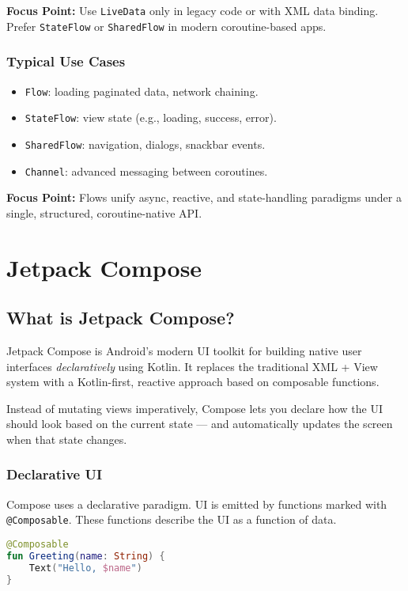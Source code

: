 \documentclass[a4paper,12pt]{article}
\begin{document}
\textbf{Focus Point:} Use \texttt{LiveData} only in legacy code or with XML data binding. Prefer \texttt{StateFlow} or \texttt{SharedFlow} in modern coroutine-based apps.

\subsubsection{Typical Use Cases}

\begin{itemize}
  \item \texttt{Flow}: loading paginated data, network chaining.
  \item \texttt{StateFlow}: view state (e.g., loading, success, error).
  \item \texttt{SharedFlow}: navigation, dialogs, snackbar events.
  \item \texttt{Channel}: advanced messaging between coroutines.
\end{itemize}

\textbf{Focus Point:} Flows unify async, reactive, and state-handling paradigms under a single, structured, coroutine-native API.


\section{Jetpack Compose}
\label{sec:what_is_compose}

\subsection{What is Jetpack Compose?}

Jetpack Compose is Android’s modern UI toolkit for building native user interfaces \textit{declaratively} using Kotlin. It replaces the traditional XML + View system with a Kotlin-first, reactive approach based on composable functions.

Instead of mutating views imperatively, Compose lets you declare how the UI should look based on the current state — and automatically updates the screen when that state changes.

\subsubsection{Declarative UI}
Compose uses a declarative paradigm. UI is emitted by functions marked with \texttt{@Composable}. These functions describe the UI as a function of data.

\begin{lstlisting}[language=Kotlin]
@Composable
fun Greeting(name: String) {
    Text("Hello, $name")
}
\end{lstlisting}
\end{document}
